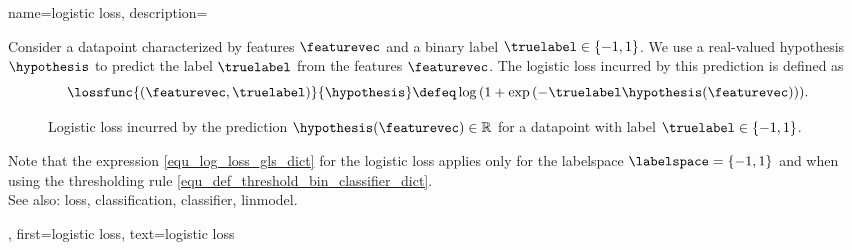 {name={logistic loss}, 
	description={Consider 
		a \gls{datapoint} characterized by \glspl{feature} $\featurevec$ and a 
		binary \gls{label} $\truelabel \in \{-1,1\}$. We use a real-valued \gls{hypothesis} 
		$\hypothesis$ to predict the \gls{label} $\truelabel$ from the \glspl{feature} 
		$\featurevec$. The logistic \gls{loss} incurred by this \gls{prediction} is 
		defined as \cite{BishopBook}
		\begin{equation} 
			\label{equ_log_loss_gls_dict}
			\lossfunc{(\featurevec,\truelabel)}{\hypothesis} \defeq  \log\, ( 1 + \exp\,(- \truelabel \hypothesis(\featurevec))).
		\end{equation}
		\begin{figure}[H]
		\begin{center}
		\caption{Logistic \gls{loss} incurred by the \gls{prediction} $\hypothesis(\featurevec) \in \mathbb{R}$ 
			for a \gls{datapoint} with \gls{label} $\truelabel \in \{-1,1\}$.}
			\label{fig_logloss_dict}
		\end{center}
		\end{figure}
		Note that the expression \eqref{equ_log_loss_gls_dict} 
		for the logistic \gls{loss} applies only for the \gls{labelspace} $\labelspace = \{ -1,1\}$ 
		and when using the thresholding rule \eqref{equ_def_threshold_bin_classifier_dict}. 
		\\
		See also: \gls{loss}, \gls{classification}, \gls{classifier}, \gls{linmodel}.},
	first={logistic loss},
	text={logistic loss}
}
	
